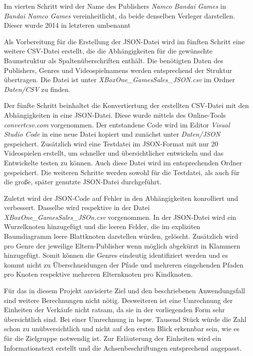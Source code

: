 \documentclass[usegeometry=true]{scrartcl}
\begin{document}
Im vierten Schritt wird der Name des Publishers \textit{Namco Bandai Games} in \textit{Bandai Namco Games} vereinheitlicht, da beide denselben Verleger darstellen. 
Dieser wurde 2014 in letzteren umbenannt

Als Vorbereitung für die Erstellung der JSON-Datei wird im fünften Schritt eine weitere CSV-Datei erstellt, die die Abhängigkeiten für die gewünschte Baumstruktur als Spaltenüberschriften enthält. 
Die benötigten Daten des Publishers, Genres und Videospielnamens werden entsprechend der Struktur übertragen. 
Die Datei ist unter \textit{XBoxOne\_GamesSales\_JSON.csv} im Ordner \textit{Daten/CSV} zu finden.

Der fünfte Schritt beinhaltet die Konvertiertung der erstellten CSV-Datei mit den Abhängigkeiten in eine JSON-Datei. 
Diese wurde mittels des Online-Tools \textit{convertcsv.com} vorgenommen. %
Der entstandene Code wird im Editor \textit{Visual Studio Code} in eine neue Datei kopiert und zunächst unter \textit{Daten/JSON} gespeichert. 
Zusätzlich wird eine Testdatei im JSON-Format mit nur 20 Videospielen erstellt, um schneller und übersichtlicher 
entwickeln und das Entwickelte testen zu können. Auch diese Datei wird im entsprechenden Ordner gespeichert. 
Die weiteren Schritte werden sowohl für die Testdatei, als auch für die große, später genutzte JSON-Datei durchgeführt.

Zuletzt wird der JSON-Code auf Fehler in den Abhängigkeiten konrolliert und verbessert.
Dasselbe wird respektive in der Datei \textit{XBoxOne\_GamesSales\_JSOn.csv} vorgenommen. 
In der JSON-Datei wird ein Wurzelknoten hinzugefügt und die leeren Felder, die im expliziten Baumdiagramm leere Blattknoten darstellen würden, gelöscht. 
Zusätzlich wird pro Genre der jeweilige Eltern-Publisher wenn möglich abgekürzt
in Klammern hinzugefügt. Somit können die Genres eindeutig identifiziert werden und es kommt nicht zu Überschneidungen der Pfade und mehreren eingehenden Pfaden pro Knoten respektive mehreren Elternknoten pro Kindknoten. 

Für das in diesem Projekt anvisierte Ziel und den beschriebenen Anwendungsfall sind weitere Berechnungen nicht nötig. %
Desweiteren ist eine Umrechnung der Einheiten der Verkäufe nicht ratsam, da sie in der vorliegenden Form sehr übersichtlich sind. 
Bei einer Umrechnung in bspw. Tausend Stück würde die Zahl schon zu unübversichtlich und nicht auf den ersten Blick erkennbar sein, wie es für die Zielgruppe notwendig ist. Zur Erläuterung der Einheiten wird ein Informationstext erstellt und die Achsenbeschriftungen entsprechend angepasst.
\end{document}
